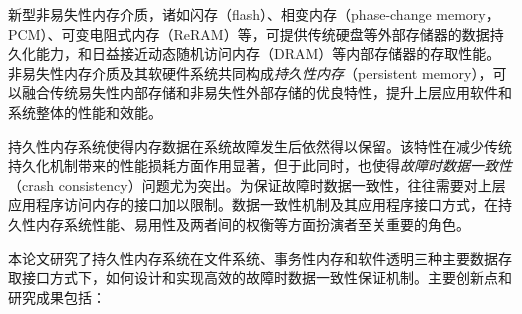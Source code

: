 \begin{cabstract}

新型非易失性内存介质，诸如闪存（flash）、相变内存（phase-change memory，PCM）、可变电阻式内存（ReRAM）等，可提供传统硬盘等外部存储器的数据持久化能力，和日益接近动态随机访问内存（DRAM）等内部存储器的存取性能。非易失性内存介质及其软硬件系统共同构成\emph{持久性内存}（persistent memory），可以融合传统易失性内部存储和非易失性外部存储的优良特性，提升上层应用软件和系统整体的性能和效能。

持久性内存系统使得内存数据在系统故障发生后依然得以保留。该特性在减少传统持久化机制带来的性能损耗方面作用显著，但于此同时，也使得\emph{故障时数据一致性}（crash consistency）问题尤为突出。为保证故障时数据一致性，往往需要对上层应用程序访问内存的接口加以限制。数据一致性机制及其应用程序接口方式，在持久性内存系统性能、易用性及两者间的权衡等方面扮演者至关重要的角色。



本论文研究了持久性内存系统在文件系统、事务性内存和软件透明三种主要数据存取接口方式下，如何设计和实现高效的故障时数据一致性保证机制。主要创新点和研究成果包括：


\end{cabstract}
